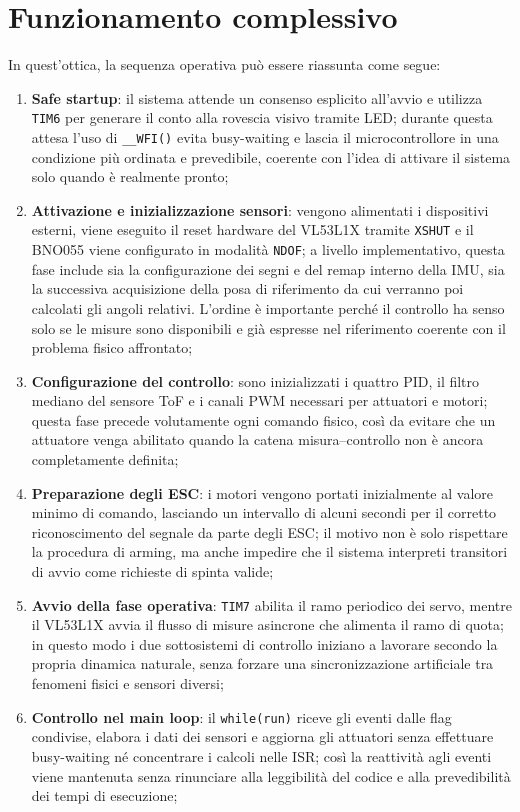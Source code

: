\documentclass[11pt]{report}
\begin{document}
	\section{Funzionamento complessivo}
	In quest'ottica, la sequenza operativa può essere riassunta come segue:
	\begin{enumerate}
		\item \textbf{Safe startup}: il sistema attende un consenso esplicito all'avvio e utilizza \texttt{TIM6} per generare il conto alla rovescia visivo tramite LED; durante questa attesa l'uso di \texttt{\_\_WFI()} evita busy-waiting e lascia il microcontrollore in una condizione più ordinata e prevedibile, coerente con l'idea di attivare il sistema solo quando è realmente pronto;
		\item \textbf{Attivazione e inizializzazione sensori}: vengono alimentati i dispositivi esterni, viene eseguito il reset hardware del VL53L1X tramite \texttt{XSHUT} e il BNO055 viene configurato in modalità \texttt{NDOF}; a livello implementativo, questa fase include sia la configurazione dei segni e del remap interno della IMU, sia la successiva acquisizione della posa di riferimento da cui verranno poi calcolati gli angoli relativi. L'ordine è importante perché il controllo ha senso solo se le misure sono disponibili e già espresse nel riferimento coerente con il problema fisico affrontato;
		\item \textbf{Configurazione del controllo}: sono inizializzati i quattro PID, il filtro mediano del sensore ToF e i canali PWM necessari per attuatori e motori; questa fase precede volutamente ogni comando fisico, così da evitare che un attuatore venga abilitato quando la catena misura--controllo non è ancora completamente definita;
		\item \textbf{Preparazione degli ESC}: i motori vengono portati inizialmente al valore minimo di comando, lasciando un intervallo di alcuni secondi per il corretto riconoscimento del segnale da parte degli ESC; il motivo non è solo rispettare la procedura di arming, ma anche impedire che il sistema interpreti transitori di avvio come richieste di spinta valide;
		\item \textbf{Avvio della fase operativa}: \texttt{TIM7} abilita il ramo periodico dei servo, mentre il VL53L1X avvia il flusso di misure asincrone che alimenta il ramo di quota; in questo modo i due sottosistemi di controllo iniziano a lavorare secondo la propria dinamica naturale, senza forzare una sincronizzazione artificiale tra fenomeni fisici e sensori diversi;
		\item \textbf{Controllo nel main loop}: il \texttt{while(run)} riceve gli eventi dalle flag condivise, elabora i dati dei sensori e aggiorna gli attuatori senza effettuare busy-waiting né concentrare i calcoli nelle ISR; così la reattività agli eventi viene mantenuta senza rinunciare alla leggibilità del codice e alla prevedibilità dei tempi di esecuzione;

\end{enumerate}
\end{document}

